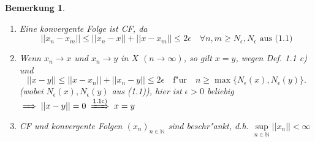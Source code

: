 \documentclass[a4paper,11pt]{book}
\def\folgt{\ensuremath{\implies}}
\newcommand{\folgtnach}[1]{\ensuremath{\DOTSB\;\xRightarrow{\text{#1}}\;}}
\newtheorem{Bem}[Def]{Bemerkung}
\theoremstyle{nonumberplain}
\newcounter{Def}
\begin{document}
\begin{Bem}
	\begin{enumerate}
	\item [(a)] Eine konvergente Folge ist CF, da
			\begin{displaymath}
				||x_{n}-x_{m}|| \leq ||x_{n}-x|| + ||x-x_{m}|| \leq 2\epsilon \quad \forall n,m \geq N_{\epsilon}, N_{\epsilon} \textrm{ aus (1.1)}
			\end{displaymath}
	\item [(b)] Wenn $x_{n} \rightarrow x$ und $x_{n} \rightarrow y$ in $X$ $(n\rightarrow \infty)$, so gilt $x=y$, wegen Def. 1.1 c) und
			\begin{displaymath}
				||x-y|| \leq ||x-x_{n}|| + ||x_{n}-y|| \leq 2\epsilon\quad \textrm{f"ur}\quad n\geq \max\{N_{\epsilon}(x),N_{\epsilon}(y)\}.
			\end{displaymath}
			(wobei $N_{\epsilon}(x),N_{\epsilon}(y)$ aus (1.1)), hier ist $\epsilon >0$ beliebig\\ $\folgt ||x-y||=0 \folgtnach{1.1c)} x=y$
	\item [(c)] CF und konvergente Folgen $(x_{n})_{n\in \mathbb{N}}$ sind beschr"ankt, d.h. $\sup\limits_{n\in\mathbb{N}}||x_{n}|| < \infty$
	\end{enumerate}
\end{Bem}
\end{document}
